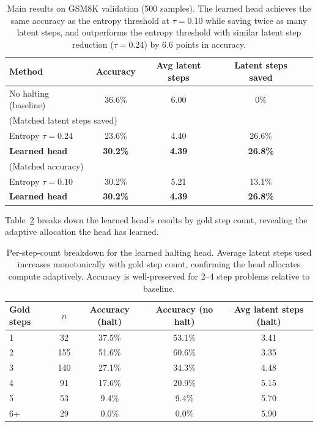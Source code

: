 \documentclass{article}
\begin{document}
\begin{table}[h!]
\centering
\small
\begin{tabular}{lcccc}
\toprule
\textbf{Method} & \textbf{Accuracy} & \textbf{Avg latent steps} & \textbf{Latent steps saved} \\
\midrule
No halting (baseline) & 36.6\% & 6.00 & 0\% \\
\midrule
\multicolumn{4}{l}{(Matched latent steps saved)} \\
Entropy $\tau = 0.24$ & 23.6\% & 4.40 & 26.6\% \\
\textbf{Learned head} & \textbf{30.2\%} & \textbf{4.39} & \textbf{26.8\%} \\
\midrule
\multicolumn{4}{l}{(Matched accuracy)} \\
Entropy $\tau = 0.10$ & 30.2\% & 5.21 & 13.1\% \\
\textbf{Learned head} & \textbf{30.2\%} & \textbf{4.39} & \textbf{26.8\%} \\
\bottomrule
\end{tabular}
\caption{Main results on GSM8K validation (500 samples).
The learned head achieves the same accuracy as the entropy threshold at $\tau{=}0.10$ while saving twice as many latent steps, and outperforms the entropy threshold with similar latent step reduction ($\tau{=}0.24$) by 6.6 points in accuracy.
}
\label{tab:main}
\end{table}

Table~\ref{tab:bysteps} breaks down the learned head's results by gold step count, revealing the adaptive allocation the head has learned.

\begin{table}[h!]
\centering
\small
\begin{tabular}{lcccc}
\toprule
\textbf{Gold steps} & \textbf{$n$} & \textbf{Accuracy (halt)} & \textbf{Accuracy (no halt)} & \textbf{Avg latent steps (halt)} \\
\midrule
1 & 32  & 37.5\% & 53.1\% & 3.41 \\
2 & 155 & 51.6\% & 60.6\% & 3.35 \\
3 & 140 & 27.1\% & 34.3\% & 4.48 \\
4 & 91  & 17.6\% & 20.9\% & 5.15 \\
5 & 53  &  9.4\% &  9.4\% & 5.70 \\
6+ & 29  &  0.0\% &  0.0\% & 5.90 \\
\bottomrule
\end{tabular}
\caption{Per-step-count breakdown for the learned halting head. Average latent steps used increases monotonically with gold step count, confirming the head allocates compute adaptively. Accuracy is well-preserved for 2--4 step problems relative to baseline.}
\label{tab:bysteps}
\end{table}
\end{document}
